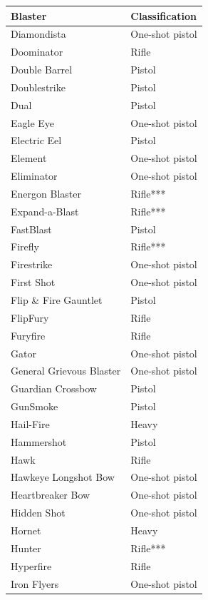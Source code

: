 \begin{table}
\begin{tabular}{|l|l|} \hline 
Blaster & Classification \\
 \hline Diamondista & One-shot pistol \\
 \hline Doominator & Rifle \\
 \hline Double Barrel & Pistol \\
 \hline Doublestrike & Pistol \\
 \hline Dual & Pistol \\
 \hline Eagle Eye & One-shot pistol \\
 \hline Electric Eel & Pistol \\
 \hline Element & One-shot pistol \\
 \hline Eliminator & One-shot pistol \\
 \hline Energon Blaster & Rifle*** \\
 \hline Expand-a-Blast & Rifle*** \\
 \hline FastBlast & Pistol \\
 \hline Firefly & Rifle*** \\
 \hline Firestrike & One-shot pistol \\
 \hline First Shot & One-shot pistol \\
 \hline Flip \& Fire Gauntlet & Pistol \\
 \hline FlipFury & Rifle \\
 \hline Furyfire & Rifle \\
 \hline Gator & One-shot pistol \\
 \hline General Grievous Blaster & One-shot pistol \\
 \hline Guardian Crossbow & Pistol \\
 \hline GunSmoke & Pistol \\
 \hline Hail-Fire & Heavy \\
 \hline Hammershot & Pistol \\
 \hline Hawk & Rifle \\
 \hline Hawkeye Longshot Bow & One-shot pistol \\
 \hline Heartbreaker Bow & One-shot pistol \\
 \hline Hidden Shot & One-shot pistol \\
 \hline Hornet & Heavy \\
 \hline Hunter & Rifle*** \\
 \hline Hyperfire & Rifle \\
 \hline Iron Flyers & One-shot pistol \\

\end{tabular}
\end{table}
